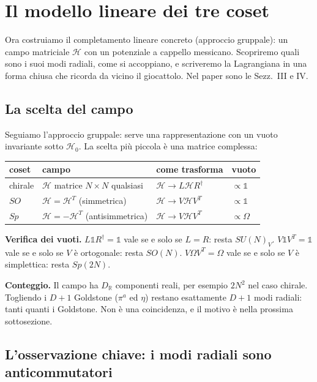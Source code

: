 \documentclass[11pt,a4paper]{article}
\numberwithin{equation}{section}
\theoremstyle{remark}
\newcommand{\Hf}{\mathcal{H}}
\newcommand{\Hg}{\mathcal{H}_0}
\newcommand{\one}{\mathbb{1}}
\newcommand{\R}{\mathbb{R}}
\begin{document}
\section{Il modello lineare dei tre coset}
\label{cap:lineare}

\begin{dove}
Ora costruiamo il completamento lineare concreto (approccio gruppale): un campo matriciale $\Hf$ con un potenziale a cappello messicano. Scopriremo quali sono i suoi modi radiali, come si accoppiano, e scriveremo la Lagrangiana in una forma chiusa che ricorda da vicino il giocattolo. Nel paper sono le Sezz.~III e IV.
\end{dove}

\subsection{La scelta del campo}

Seguiamo l'approccio gruppale: serve una rappresentazione con un vuoto invariante sotto $\Hg$. La scelta più piccola è una matrice complessa:
\begin{center}
\begin{tabular}{llll}
\hline
coset & campo & come trasforma & vuoto\\
\hline
chirale & $\Hf$ matrice $N\times N$ qualsiasi & $\Hf\to L\Hf R^\dagger$ & $\propto\one$\\
$SO$ & $\Hf=\Hf^T$ (simmetrica) & $\Hf\to V\Hf V^T$ & $\propto\one$\\
$Sp$ & $\Hf=-\Hf^T$ (antisimmetrica) & $\Hf\to V\Hf V^T$ & $\propto\Omega$\\
\hline
\end{tabular}
\end{center}
\textbf{Verifica dei vuoti.} $L\one R^\dagger=\one$ vale se e solo se $L=R$: resta $SU(N)_V$. $V\one V^T=\one$ vale se e solo se $V$ è ortogonale: resta $SO(N)$. $V\Omega V^T=\Omega$ vale se e solo se $V$ è simplettica: resta $Sp(2N)$.

\textbf{Conteggio.} Il campo ha $D_\R$ componenti reali, per esempio $2N^2$ nel caso chirale. Togliendo i $D+1$ Goldstone ($\pi^a$ ed $\eta$) restano esattamente $D+1$ modi radiali: tanti quanti i Goldstone. Non è una coincidenza, e il motivo è nella prossima sottosezione.

\subsection{L'osservazione chiave: i modi radiali sono anticommutatori}
\end{document}

